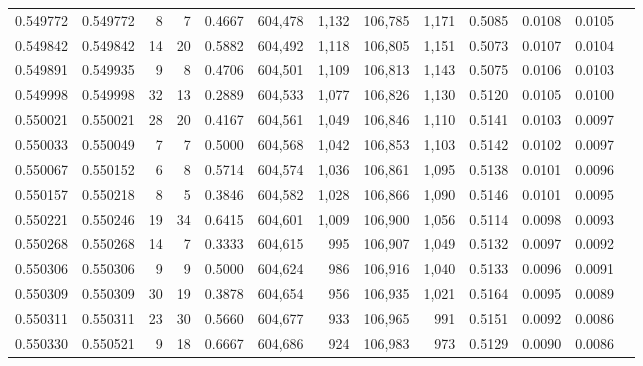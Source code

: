 \begin{tabular}{rrrrrrrrrrrrr}
0.549772 & 0.549772 &     8 &     7 &                                     0.4667 & 604,478 &   1,132 & 106,785 &   1,171 & 0.5085 & 0.0108 & 0.0105 \\
0.549842 & 0.549842 &    14 &    20 &                                     0.5882 & 604,492 &   1,118 & 106,805 &   1,151 & 0.5073 & 0.0107 & 0.0104 \\
0.549891 & 0.549935 &     9 &     8 &                                     0.4706 & 604,501 &   1,109 & 106,813 &   1,143 & 0.5075 & 0.0106 & 0.0103 \\
0.549998 & 0.549998 &    32 &    13 &                                     0.2889 & 604,533 &   1,077 & 106,826 &   1,130 & 0.5120 & 0.0105 & 0.0100 \\
0.550021 & 0.550021 &    28 &    20 &                                     0.4167 & 604,561 &   1,049 & 106,846 &   1,110 & 0.5141 & 0.0103 & 0.0097 \\
0.550033 & 0.550049 &     7 &     7 &                                     0.5000 & 604,568 &   1,042 & 106,853 &   1,103 & 0.5142 & 0.0102 & 0.0097 \\
0.550067 & 0.550152 &     6 &     8 &                                     0.5714 & 604,574 &   1,036 & 106,861 &   1,095 & 0.5138 & 0.0101 & 0.0096 \\
0.550157 & 0.550218 &     8 &     5 &                                     0.3846 & 604,582 &   1,028 & 106,866 &   1,090 & 0.5146 & 0.0101 & 0.0095 \\
0.550221 & 0.550246 &    19 &    34 &                                     0.6415 & 604,601 &   1,009 & 106,900 &   1,056 & 0.5114 & 0.0098 & 0.0093 \\
0.550268 & 0.550268 &    14 &     7 &                                     0.3333 & 604,615 &     995 & 106,907 &   1,049 & 0.5132 & 0.0097 & 0.0092 \\
0.550306 & 0.550306 &     9 &     9 &                                     0.5000 & 604,624 &     986 & 106,916 &   1,040 & 0.5133 & 0.0096 & 0.0091 \\
0.550309 & 0.550309 &    30 &    19 &                                     0.3878 & 604,654 &     956 & 106,935 &   1,021 & 0.5164 & 0.0095 & 0.0089 \\
0.550311 & 0.550311 &    23 &    30 &                                     0.5660 & 604,677 &     933 & 106,965 &     991 & 0.5151 & 0.0092 & 0.0086 \\
0.550330 & 0.550521 &     9 &    18 &                                     0.6667 & 604,686 &     924 & 106,983 &     973 & 0.5129 & 0.0090 & 0.0086 \\

\end{tabular}
